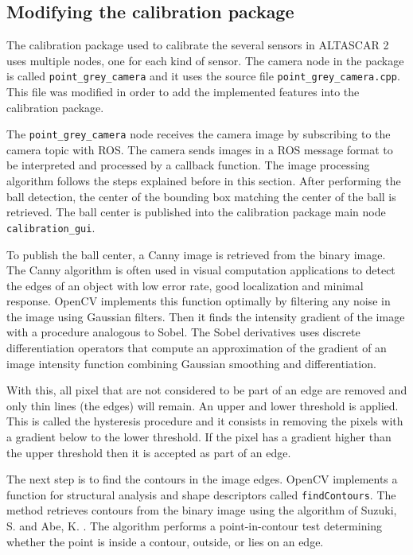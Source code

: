 \subsection{Modifying the calibration package}

The calibration package used to calibrate the several sensors in ALTASCAR 2 uses multiple nodes, one for each kind of sensor. The camera node in the package is called \texttt{point\_grey\_camera} and it uses the source file \texttt{point\_grey\_camera.cpp}. This file was modified in order to add the implemented features into the calibration package. 

The \texttt{point\_grey\_camera} node receives the camera image by subscribing to the camera topic with ROS. The camera sends images in a ROS message format to be interpreted and processed by a callback function. The image processing algorithm follows the steps explained before in this section. After performing the ball detection, the center of the bounding box matching the center of the ball is retrieved. The ball center is published into the calibration package main node \texttt{calibration\_gui}.

To publish the ball center, a Canny image is retrieved from the binary image. The Canny algorithm is often used in visual computation applications to detect the edges of an object with low error rate, good localization and minimal response. OpenCV implements this function optimally by filtering any noise in the image using Gaussian filters. \cite{OpenCV2.4.13.6documentationa} Then it finds the intensity gradient of the image with a procedure analogous to Sobel. The Sobel derivatives uses discrete differentiation operators that compute an approximation of the gradient of an image intensity function combining Gaussian smoothing and differentiation. \cite{OpenCV2.4.13.6documentationb} 

With this, all pixel that are not considered to be part of an edge are removed and only thin lines (the edges) will remain. An upper and lower threshold is applied. This is called the hysteresis procedure and it consists in removing the pixels with a gradient below to the lower threshold. If the pixel has a gradient higher than the upper threshold then it is accepted as part of an edge.

The next step is to find the contours in the image edges. OpenCV implements a function for structural analysis and shape descriptors called \texttt{findContours}. The method retrieves contours from the binary image using the algorithm of Suzuki, S. and Abe, K. \cite{Suzuki1985}. The algorithm performs a point-in-contour test determining whether the point is inside a contour, outside, or lies on an edge. 

